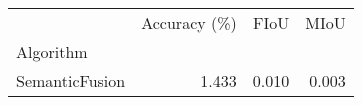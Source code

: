 \begin{tabular}{lrrr}
\toprule
{} &  Accuracy (\%) &  FIoU &  MIoU \\
Algorithm       &               &       &       \\
\midrule
SemanticFusion &         1.433 & 0.010 & 0.003 \\
\bottomrule
\end{tabular}
